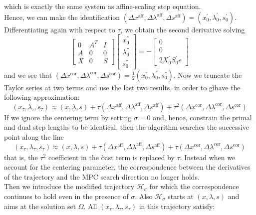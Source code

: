 \documentclass[a4paper,10 pt,titlepage,twoside]{book}
\theoremstyle{plain}
\theoremstyle{definition}
\theoremstyle{remark}
\begin{document}
which is exactly the same system as affine-scaling step equation.\\
Hence, we can make the identification $(\Delta x^{\text{aff}},\Delta \lambda^{\text{aff}},\Delta s^{\text{aff}})=(x^{'}_{0},\lambda^{'}_{0},s^{'}_{0})$. Differentiating again with respect to $\tau$, we obtain the second derivative solving
\begin{equation}
\begin{bmatrix}
0&A^{T}&I \\A&0&0\\X&0&S
\end{bmatrix}\begin{bmatrix}
x_{0}^{''}\\\lambda_{0}^{''}\\s_{0}^{''}
\end{bmatrix}=-\begin{bmatrix}
0\\0\\2X^{'}_{0}S^{'}_{0}e
\end{bmatrix}
\end{equation}
and we see that $(\Delta x^{\text{cor}},\Delta \lambda^{\text{cor}},\Delta s^{\text{cor}})=\frac{1}{2}(x^{''}_{0},\lambda^{''}_{0},s^{''}_{0})$. Now we truncate the Taylor series at two terms and use the last two results, in order to gìhave the following approximation:
\begin{equation}
(x_{\tau},\lambda_{\tau}, s_{\tau})\approx(x, \lambda, s)+ \tau(\Delta x^{\text{aff}},\Delta \lambda^{\text{aff}},\Delta s^{\text{aff}})+\tau^{2}(\Delta x^{\text{cor}},\Delta \lambda^{\text{cor}},\Delta s^{\text{cor}})
\end{equation}
If we ignore the centering term  by setting $\sigma =0$ and, hence, constrain the primal and dual step lengths to be identical, then the algorithm searches the successive point along the line
\begin{equation}
(x_{\tau},\lambda_{\tau}, s_{\tau})\approx(x, \lambda, s)+ \tau(\Delta x^{\text{aff}},\Delta \lambda^{\text{aff}},\Delta s^{\text{aff}})+\tau(\Delta x^{\text{cor}},\Delta \lambda^{\text{cor}},\Delta s^{\text{cor}})
\end{equation} 
that is, the $\tau^{2}$ coefficient in the òast term is replaced by $\tau$. Instead when we account for the centering parameter, the correspondence between the derivatives of the trajectory and the MPC search direction no longer holds. \\
Then we introduce the modified trajectory $\mathcal{H}_{\sigma}$ for which the correspondence continues to hold even in the presence of $\sigma$. Also $\mathcal{H}_{\sigma}$ starts at $(x, \lambda, s)$ and aims at the solution set $\Omega$. All $(x_{\tau},\lambda_{\tau},s_{\tau})$ in this trajectory satisfy:
\end{document}
